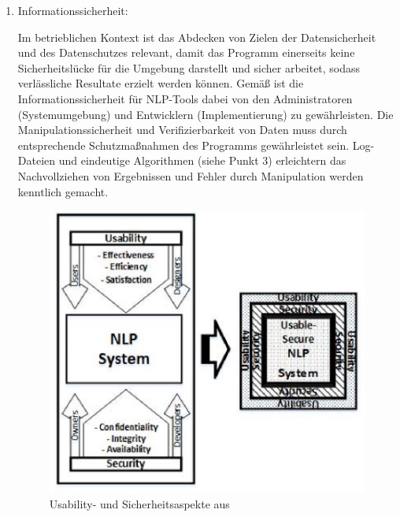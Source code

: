 \documentclass[12pt]{report}
\begin{document}
\begin{enumerate}
\item Informationssicherheit:

Im betrieblichen Kontext ist das Abdecken von Zielen der Datensicherheit und des Datenschutzes relevant, damit das Programm einerseits keine Sicherheitslücke für die Umgebung darstellt und sicher arbeitet, sodass verlässliche Resultate erzielt werden können. Gemäß \cite{hm13} ist die Informationssicherheit für NLP-Tools dabei von den Administratoren (Systemumgebung) und Entwicklern (Implementierung) zu gewährleisten. Die Manipulationssicherheit und Verifizierbarkeit von Daten muss durch entsprechende Schutzmaßnahmen des Programms gewährleistet sein. Log-Dateien und eindeutige Algorithmen (siehe Punkt 3) erleichtern das Nachvollziehen von Ergebnissen und Fehler durch Manipulation werden kenntlich gemacht. 

\begin{figure}[h!]
\begin{center}
\includegraphics[scale=0.5]{GATE_Bilder/NLPSystem.jpg}
\caption{Usability- und Sicherheitsaspekte aus \cite{hm13}}
\end{center}
\end{figure} 


\end{enumerate}
\end{document}
